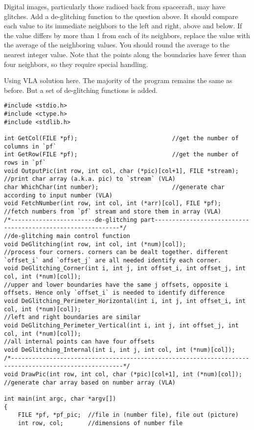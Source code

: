 \begin{question}
Digital images, particularly those radioed back from spacecraft, may have glitches. Add
a de-glitching function to the question above. It should compare each value to its
immediate neighbors to the left and right, above and below. If the value differs by more
than 1 from each of its neighbors, replace the value with the average of the neighboring
values. You should round the average to the nearest integer value. Note that the points
along the boundaries have fewer than four neighbors, so they require special handling.
\end{question}
\begin{solution}
  Using VLA solution here.
  The majority of the program remains the same as before. But a set of de-glitching functions is added.
  \begin{verbatim}
#include <stdio.h>
#include <ctype.h>
#include <stdlib.h>

int GetCol(FILE *pf);							//get the number of columns in `pf`
int GetRow(FILE *pf);							//get the number of rows in `pf`
void OutputPic(int row, int col, char (*pic)[col+1], FILE *stream);	//print char array (a.k.a. pic) to `stream` (VLA)
char WhichChar(int number);						//generate char according to input number (VLA)
void FetchNumber(int row, int col, int (*arr)[col], FILE *pf);	//fetch numbers from `pf` stream and store them in array (VLA)
/*------------------------de-glitching part------------------------------------------------------------*/
//de-glitching main control function
void DeGlitching(int row, int col, int (*num)[col]);
//process four corners. corners can be dealt together. different `offset_i` and `offset_j` are all needed identify each corner.
void DeGlitching_Corner(int i, int j, int offset_i, int offset_j, int col, int (*num)[col]);
//upper and lower boundaries have the same j offsets, opposite i offsets. Hence only `offset_i` is needed to identify difference
void DeGlitching_Perimeter_Horizontal(int i, int j, int offset_i, int col, int (*num)[col]);
//left and right boundaries are similar
void DeGlitching_Perimeter_Vertical(int i, int j, int offset_j, int col, int (*num)[col]);
//all internal points can have four offsets
void DeGlitching_Internal(int i, int j, int col, int (*num)[col]);
/*------------------------------------------------------------------------------------------------------*/
void DrawPic(int row, int col, char (*pic)[col+1], int (*num)[col]);	//generate char array based on number array (VLA)

int main(int argc, char *argv[])
{
	FILE *pf, *pf_pic;	//file in (number file), file out (picture)
	int row, col;		//dimensions of number file


\end{verbatim}
\end{solution}
